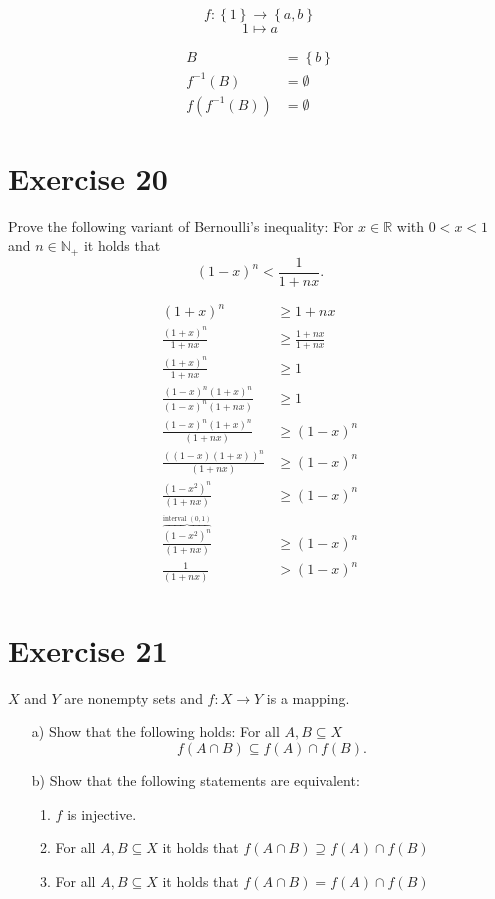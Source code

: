 \documentclass[a4paper]{article}
\theoremstyle{definition}
\newcommand\set[1]{\left\{#1\right\}}
\begin{document}
\[ f: \set{1} \rightarrow \set{a, b} \]
\[ 1 \mapsto a \]

\begin{align*}
  B &= \set{b} \\
  f^{-1}(B) &= \emptyset \\
  f(f^{-1}(B)) &= \emptyset
\end{align*}

\section{Exercise 20}

\begin{ex}
  Prove the following variant of Bernoulli's inequality: For $x \in \mathbb{R}$
  with $0 < x < 1$ and $n \in \mathbb{N}_+$ it holds that
  \[ (1 - x)^n < \frac{1}{1 + nx}. \]
\end{ex}
\begin{align*}
  (1 + x)^n &\geq 1 + nx \\
  \frac{(1 + x)^n}{1 + nx} &\geq \frac{1 + nx}{1 + nx} \\
  \frac{(1 + x)^n}{1 + nx} &\geq 1 \\
  \frac{(1 - x)^n (1 + x)^n}{(1 - x)^n (1 + nx)} &\geq 1 \\
  \frac{(1 - x)^n (1 + x)^n}{(1 + nx)} &\geq (1 - x)^n \\
  \frac{\left((1 - x)(1 + x)\right)^n}{(1 + nx)} &\geq (1 - x)^n \\
  \frac{\left(1 - x^2\right)^n}{(1 + nx)} &\geq (1 - x)^n \\
  \frac{\overbrace{\left(1 - x^2\right)^n}^{\text{interval }(0,1)}}{(1 + nx)} &\geq (1 - x)^n \\
  \frac{1}{(1 + nx)} &> (1 - x)^n \\
\end{align*}


\section{Exercise 21}

\begin{ex}
  $X$ and $Y$ are nonempty sets and $f: X \rightarrow Y$ is a mapping.
  \begin{itemize}
    \item[a)]
      Show that the following holds: For all $A, B \subseteq X$
      \[ f(A \cap B) \subseteq f(A) \cap f(B). \]
    \item[b)]
      Show that the following statements are equivalent:
      \begin{enumerate}
        \item $f$ is injective.
        \item For all $A, B \subseteq X$ it holds that $f(A \cap B) \supseteq f(A) \cap f(B)$
        \item For all $A, B \subseteq X$ it holds that $f(A \cap B) = f(A) \cap f(B)$
      \end{enumerate}
  \end{itemize}
\end{ex}
\end{document}

